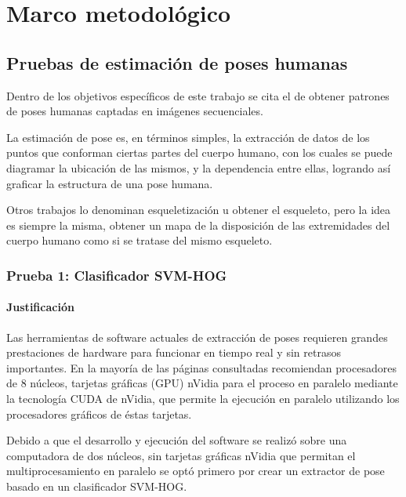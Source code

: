\documentclass[a4paper,12pt,oneside,spanish]{book}
\begin{document}
\newpage
\chapter{Marco metodológico}
\section{Pruebas de estimación de poses humanas}\label{pruebaspose}

Dentro de los objetivos específicos de este trabajo se cita el de obtener patrones de poses humanas captadas en imágenes secuenciales.\par

La estimación de pose es, en términos simples, la extracción de datos  de los puntos que conforman ciertas partes del cuerpo humano, con los cuales se puede diagramar la ubicación de las mismos, y la dependencia entre ellas, logrando así graficar la estructura de una pose humana.\par

Otros trabajos lo denominan esqueletización u obtener el esqueleto, pero la idea es siempre la misma, obtener un mapa de la disposición de las extremidades del cuerpo humano como si se tratase del mismo esqueleto.\par

\subsection{Prueba 1: Clasificador SVM-HOG}

\subsubsection{Justificación}
Las herramientas de software actuales de extracción de poses requieren grandes prestaciones de hardware para funcionar en tiempo real y sin retrasos importantes. En la mayoría de las páginas consultadas recomiendan procesadores de 8 núcleos, tarjetas gráficas (GPU) nVidia para el proceso en paralelo mediante la tecnología CUDA de nVidia, que permite la ejecución en paralelo utilizando los procesadores gráficos de éstas tarjetas.\par

Debido a que el desarrollo y ejecución del software se realizó sobre una computadora de dos núcleos, sin tarjetas gráficas nVidia que permitan el multiprocesamiento en paralelo se optó primero por crear un extractor de pose basado en un clasificador SVM-HOG.\par
\end{document}
